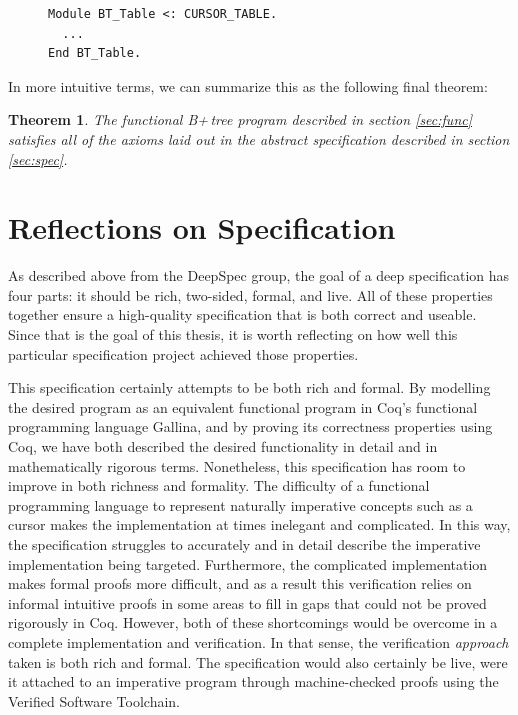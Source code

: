 \documentclass[a4paper,12pt]{article}
\newtheorem{theorem}{Theorem}
\begin{document}
\begin{figure}[h]
\begin{singlespace}
\begin{verbatim}
Module BT_Table <: CURSOR_TABLE.
  ...
End BT_Table.
\end{verbatim}
\end{singlespace}
\end{figure}

In more intuitive terms, we can summarize this as the following final theorem:

\begin{theorem}
The functional B+\,tree program described in section \ref{sec:func} satisfies all of the axioms laid out in the abstract specification described in section \ref{sec:spec}.
\end{theorem}


\clearpage

\section{Reflections on Specification}

As described above from the DeepSpec group, the goal of a deep specification has four parts: it should be rich, two-sided, formal, and live. All of these properties together ensure a high-quality specification that is both correct and useable. Since that is the goal of this thesis, it is worth reflecting on how well this particular specification project achieved those properties.

This specification certainly attempts to be both rich and formal. By modelling the desired program as an equivalent functional program in Coq’s functional programming language Gallina, and by proving its correctness properties using Coq, we have both described the desired functionality in detail and in mathematically rigorous terms. Nonetheless, this specification has room to improve in both richness and formality. The difficulty of a functional programming language to represent naturally imperative concepts such as a cursor makes the implementation at times inelegant and complicated. In this way, the specification struggles to accurately and in detail describe the imperative implementation being targeted. Furthermore, the complicated implementation makes formal proofs more difficult, and as a result this verification relies on informal intuitive proofs in some areas to fill in gaps that could not be proved rigorously in Coq. However, both of these shortcomings would be overcome in a complete implementation and verification. In that sense, the verification \textit{approach} taken is both rich and formal. The specification would also certainly be live, were it attached to an imperative program through machine-checked proofs using the Verified Software Toolchain.
\end{document}
